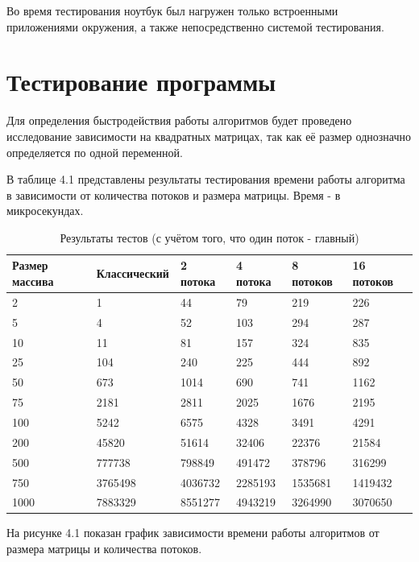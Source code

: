 Во время тестирования ноутбук был нагружен только встроенными приложениями окружения, а также непосредственно системой тестирования.

\section{Тестирование программы}
Для определения быстродействия работы алгоритмов будет проведено исследование зависимости
на квадратных матрицах, так как её размер однозначно определяется по одной переменной. 

В таблице 4.1 представлены результаты тестирования времени работы алгоритма в зависимости от количества потоков и размера матрицы.
Время - в микросекундах.

\FloatBarrier
\begin{table}[h]
	\caption{Результаты тестов (с учётом того, что один поток - главный)}
	\centering
	\begin{tabular}{ | l | l | l | l | l | l |}
		\hline
		Размер массива & Классический & 2 потока & 4 потока & 8 потоков & 16 потоков \\ \hline
		2 & 1 & 44 & 79 & 219 & 226 \\
		5 & 4 & 52 & 103 & 294 & 287 \\
		10 & 11 & 81 & 157 &  324 & 835 \\
		25 & 104 & 240 & 225 & 444 & 892\\
		50 & 673 & 1014 & 690 & 741 & 1162\\
		75 & 2181 & 2811 & 2025 & 1676 & 2195 \\
		100 & 5242 & 6575 & 4328 & 3491 & 4291 \\
		200 & 45820 & 51614 & 32406 & 22376 & 21584 \\
		500 & 777738 & 798849 & 491472 & 378796 & 316299 \\
		750 &  3765498 & 4036732 & 2285193 & 1535681 & 1419432 \\
		1000 & 7883329 & 8551277 & 4943219 & 3264990 & 3070650 \\
		\hline
	\end{tabular}
\end{table}
\FloatBarrier
На рисунке 4.1 показан график зависимости времени работы алгоритмов от размера матрицы и количества потоков.

